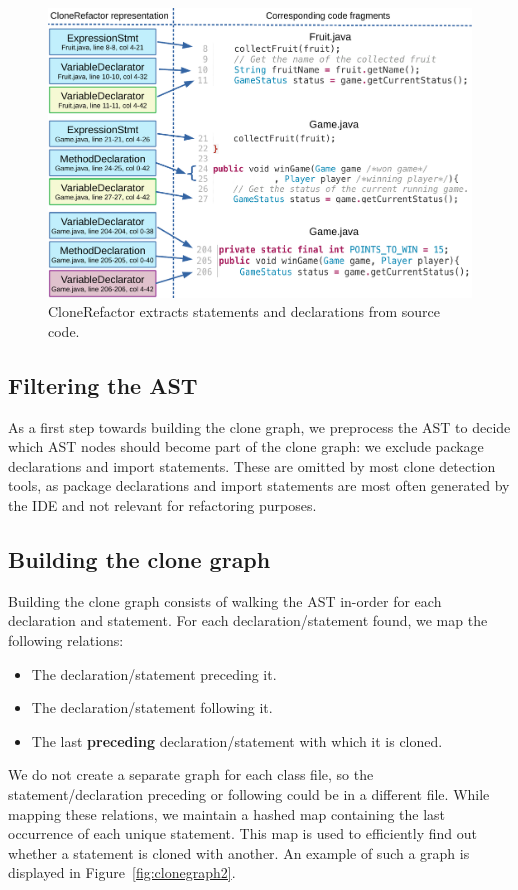 \documentclass[conference]{IEEEtran}
\begin{document}
\begin{figure}
  \centering
  \includegraphics[width=1\textwidth]{img/CloneGraphCode}
  \caption{CloneRefactor extracts statements and declarations from source code.}
  \label{fig:clonegraph}
\end{figure}

\subsection{Filtering the AST}
As a first step towards building the clone graph, we preprocess the AST to decide which AST nodes should become part of the clone graph: we exclude package declarations and import statements. These are omitted by most clone detection tools, as package declarations and import statements are most often generated by the IDE and not relevant for refactoring purposes.

\subsection{Building the clone graph}\label{sec:buildingclonegraph}
Building the clone graph consists of walking the AST in-order for each declaration and statement. For each declaration/statement found, we map the following relations:
\begin{itemize}
  \item The declaration/statement preceding it.
  \item The declaration/statement following it.
  \item The last \textbf{preceding} declaration/statement with which it is cloned.
\end{itemize}
We do not create a separate graph for each class file, so the statement/declaration preceding or following could be in a different file. While mapping these relations, we maintain a hashed map containing the last occurrence of each unique statement. This map is used to efficiently find out whether a statement is cloned with another. An example of such a graph is displayed in Figure~\ref{fig:clonegraph2}.
\end{document}
